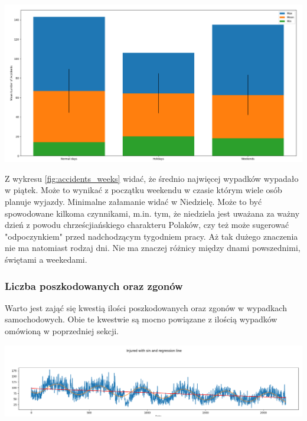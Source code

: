 \documentclass{article}
\begin{document}
\begin{center}
    \includegraphics[scale=0.3]{visualization/normal_vs_holidays_vs_weekends.png}
    \captionsetup{hypcap=false}
    \label{fig:accidents_types}
\end{center}

Z wykresu \ref{fig:accidents_weeks} widać, że średnio najwięcej wypadków wypadało w piątek. Może to wynikać z początku weekendu w czasie którym wiele osób planuje wyjazdy. Minimalne załamanie widać w Niedzielę. Może to być spowodowane kilkoma czynnikami, m.in. tym, że niedziela jest uważana za ważny dzień z powodu chrześcjiańskiego charakteru Polaków, czy też może sugerować "odpoczynkiem" przed nadchodzącym tygodniem pracy.
Aż tak dużego znaczenia nie ma natomiast rodzaj dni. Nie ma znaczej różnicy między dnami powszednimi, świętami a weekedami. 

\subsubsection{Liczba poszkodowanych oraz zgonów}

Warto jest zająć się kwestią ilości poszkodowanych oraz zgonów w wypadkach samochodowych. Obie te kwestwie są mocno powiązane z ilością wypadków omówioną w poprzedniej sekcji. 

\begin{center}
    \includegraphics[scale=0.3]{visualization/injured_sin.png}
    \captionsetup{hypcap=false}
    \label{fig:injured_death}
\end{center}
\end{document}
